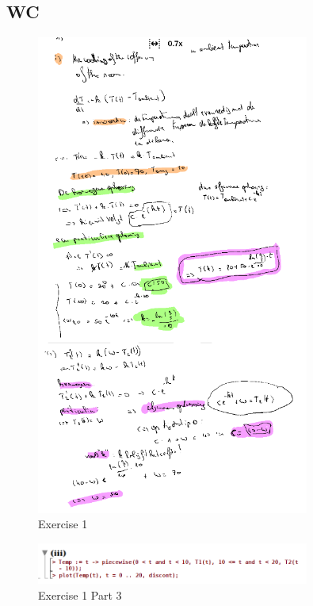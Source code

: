 \documentclass[a4paper]{report}
\begin{document}


\subsection{WC}

\begin{figure}[H]
	\centering
	\includegraphics[width=0.8\textwidth]{assets/wc_8_ex_1.png}
	\caption{Exercise 1}
	\label{fig:wc_8_ex_1}
\end{figure}

\begin{figure}[H]
	\centering
	\includegraphics[width=0.8\textwidth]{assets/wc_8_ex_1_part_3.png}
	\caption{Exercise 1 Part 3}
	\label{fig:wc_8_ex_1_part_3}
\end{figure}
\end{document}
